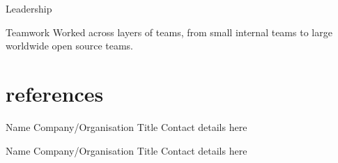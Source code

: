 \documentclass[]{friggeri-cv} %
\begin{document}
\begin{entrylist}




\entry
{}
{Leadership}
{}
{}
{

}



\entry
{}
{Teamwork}
{}
{}
{
Worked across layers of teams, from small internal teams to large worldwide open source teams.
}




\end{entrylist}



\section{references}


\begin{entrylist}


\entry
{}
{Name}
{Company/Organisation}
{Title}
{
Contact details here
}


\entry
{}
{Name}
{Company/Organisation}
{Title}
{
Contact details here
}

\end{entrylist} 

\end{document}
